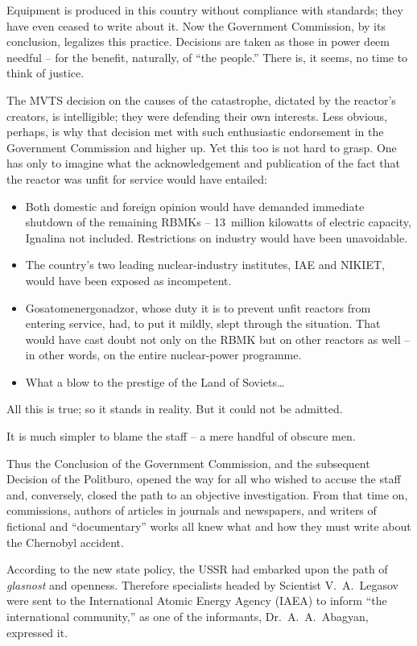 \documentclass[openright]{bookest}
\begin{document}
Equipment is produced in this country without compliance with standards; they have even ceased to write about it. Now the Government Commission, by its conclusion, legalizes this practice. Decisions are taken as those in power deem needful -- for the benefit, naturally, of ``the people.'' There is, it seems, no time to think of justice.

The MVTS decision on the causes of the catastrophe, dictated by the reactor's creators, is intelligible; they were defending their own interests. Less obvious, perhaps, is why that decision met with such enthusiastic endorsement in the Government Commission and higher up. Yet this too is not hard to grasp. One has only to imagine what the acknowledgement and publication of the fact that the reactor was unfit for service would have entailed:

\begin{itemize}
\item Both domestic and foreign opinion would have demanded immediate shutdown of the remaining RBMKs -- \num{13}~million kilowatts of electric capacity, Ignalina not included. Restrictions on industry would have been unavoidable.
\item The country's two leading nuclear-industry institutes, IAE and NIKIET, would have been exposed as incompetent.
\item Gosatomenergonadzor, whose duty it is to prevent unfit reactors from entering service, had, to put it mildly, slept through the situation. That would have cast doubt not only on the RBMK but on other reactors as well -- in other words, on the entire nuclear-power programme.
\item What a blow to the prestige of the Land of Soviets\ldots
\end{itemize}

All this is true; so it stands in reality. But it could not be admitted.

It is much simpler to blame the staff -- a mere handful of obscure men.

Thus the Conclusion of the Government Commission, and the subsequent Decision of the Politburo, opened the way for all who wished to accuse the staff and, conversely, closed the path to an objective investigation. From that time on, commissions, authors of articles in journals and newspapers, and writers of fictional and ``documentary'' works all knew what and how they must write about the Chernobyl accident.

According to the new state policy, the USSR had embarked upon the path of \textit{glasnost} and openness. Therefore specialists headed by Scientist V.~A.~Legasov were sent to the International Atomic Energy Agency (IAEA) to inform ``the international community,'' as one of the informants, Dr.~A.~A.~Abagyan, expressed it.
\end{document}
